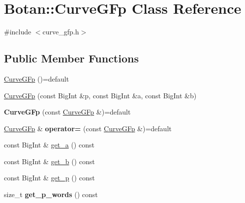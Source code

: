 \hypertarget{class_botan_1_1_curve_g_fp}{}\section{Botan\+:\+:Curve\+G\+Fp Class Reference}
\label{class_botan_1_1_curve_g_fp}


{\ttfamily \#include $<$curve\+\_\+gfp.\+h$>$}

\subsection*{Public Member Functions}
\begin{DoxyCompactItemize}
\item 
\hyperlink{class_botan_1_1_curve_g_fp_aa040fce271ca5bcff4b19717aae958a2}{Curve\+G\+Fp} ()=default
\item 
\hyperlink{class_botan_1_1_curve_g_fp_aaeb72bf32cd4e5169be11094c244f92b}{Curve\+G\+Fp} (const Big\+Int \&p, const Big\+Int \&a, const Big\+Int \&b)
\item 
\mbox{\label{class_botan_1_1_curve_g_fp_a0827d9e3a5e78669d53b85591985ec26}} 
{\bfseries Curve\+G\+Fp} (const \hyperlink{class_botan_1_1_curve_g_fp}{Curve\+G\+Fp} \&)=default
\item 
\mbox{\label{class_botan_1_1_curve_g_fp_a68e202327c9eb8e76b8291750f4bdce7}} 
\hyperlink{class_botan_1_1_curve_g_fp}{Curve\+G\+Fp} \& {\bfseries operator=} (const \hyperlink{class_botan_1_1_curve_g_fp}{Curve\+G\+Fp} \&)=default
\item 
const Big\+Int \& \hyperlink{class_botan_1_1_curve_g_fp_a20794afb1e795f6c571bf535a875f588}{get\+\_\+a} () const
\item 
const Big\+Int \& \hyperlink{class_botan_1_1_curve_g_fp_ac5dfeca3af6f79d62334b1efd5392764}{get\+\_\+b} () const
\item 
const Big\+Int \& \hyperlink{class_botan_1_1_curve_g_fp_ae2fbbaf2290f610c23719a395e935f1e}{get\+\_\+p} () const
\item 
\mbox{\label{class_botan_1_1_curve_g_fp_abf3dbc424a1738d64145be1e3183d271}} 
size\+\_\+t {\bfseries get\+\_\+p\+\_\+words} () const
\item 
\mbox{\label{class_botan_1_1_curve_g_fp_a21119bc97e1b671511030a58809f5e3b}} 

\end{DoxyCompactItemize}
